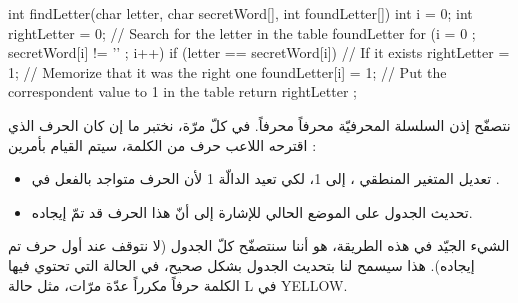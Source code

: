 \begin{Csource}
int findLetter(char letter, char secretWord[], int foundLetter[])
{
  int i = 0;
  int rightLetter = 0;
  // Search for the letter in the table foundLetter
  for (i = 0 ; secretWord[i] != '\0' ; i++)
  {
    if (letter == secretWord[i]) // If it exists
    {
      rightLetter = 1; // Memorize that it was the right one
      foundLetter[i] = 1; // Put the correspondent value to 1 in the table
    }
  }
  return rightLetter ;
}
\end{Csource}

نتصفّح إذن السلسلة المحرفيّة
محرفاً محرفاً. في كلّ مرّة، نختبر ما إن كان الحرف الذي اقترحه اللاعب حرف من الكلمة، سيتم القيام بأمرين :
\begin{itemize}
  \item تعديل المتغير المنطقي
،
إلى  1، لكي تعيد الدالّة 1 لأن الحرف متواجد بالفعل في
.
  \item تحديث الجدول
على الموضع الحالي للإشارة إلى أنّ هذا الحرف قد تمّ إيجاده.
\end{itemize}

الشيء الجيّد في هذه الطريقة، هو أننا سنتصفّح كلّ الجدول (لا نتوقف عند أول حرف تم إيجاده). هذا سيسمح لنا بتحديث الجدول
بشكل صحيح، في الحالة التي تحتوي فيها الكلمة حرفاً مكرراً عدّة مرّات، مثل حالة
\textenglish{L}
في
\textenglish{YELLOW}.
